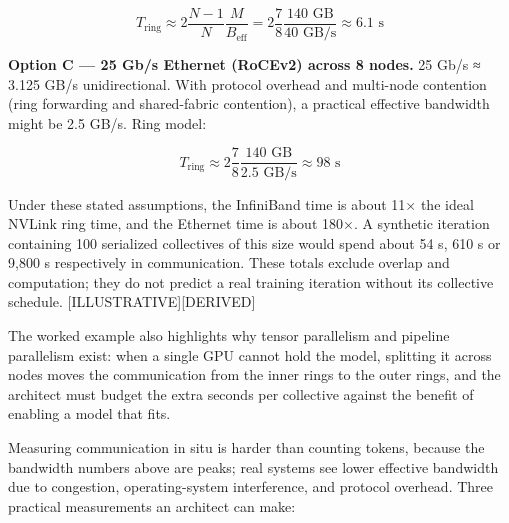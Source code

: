 \[
T_\text{ring} \approx 2\frac{N-1}{N}\frac{M}{B_\text{eff}} = 2\frac{7}{8}\frac{140 \text{ GB}}{40 \text{ GB/s}} \approx 6.1 \text{ s}
\]


\textbf{Option C --- 25 Gb/s Ethernet (RoCEv2) across 8 nodes.} 25 Gb/s
≈ 3.125 GB/s unidirectional. With protocol overhead and multi-node
contention (ring forwarding and shared-fabric contention), a practical
effective bandwidth might be 2.5 GB/s. Ring model:

\[
T_\text{ring} \approx 2\frac{7}{8}\frac{140 \text{ GB}}{2.5 \text{ GB/s}} \approx 98 \text{ s}
\]

Under these stated assumptions, the InfiniBand time is about 11× the
ideal NVLink ring time, and the Ethernet time is about 180×. A synthetic
iteration containing 100 serialized collectives of this size would spend
about 54 s, 610 s or 9,800 s respectively in communication. These totals
exclude overlap and computation; they do not predict a real training
iteration without its collective schedule.
\mbox{{[}ILLUSTRATIVE{]}}\hspace{0pt}\mbox{{[}DERIVED{]}}

The worked example also highlights why tensor parallelism and pipeline
parallelism exist: when a single GPU cannot hold the model, splitting it
across nodes moves the communication from the inner rings to the outer
rings, and the architect must budget the extra seconds per collective
against the benefit of enabling a model that fits.

\label{measurement}


Measuring communication in situ is harder than counting tokens, because
the bandwidth numbers above are peaks; real systems see lower effective
bandwidth due to congestion, operating-system interference, and protocol
overhead. Three practical measurements an architect can make:

